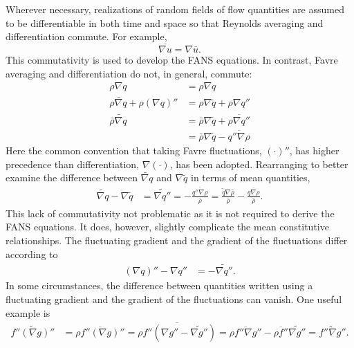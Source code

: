 Wherever necessary, realizations of random fields of flow quantities
are assumed to be differentiable in both time and space so that Reynolds
averaging and differentiation commute.  For example,
%
\begin{equation*}
\overline{ \nabla{}u } = \nabla\bar{u}.
\end{equation*}
%
This commutativity is used to develop the FANS equations.  In contrast, Favre
averaging and differentiation do not, in general, commute:
\begin{align}
  \rho \nabla q &= \rho \nabla q
\\
   \rho \widetilde{\nabla{}q} + \rho \left(\nabla{}q\right)''
&=
   \rho \nabla \tilde{q} + \rho \nabla{}q''
\\
     \bar{\rho} \widetilde{\nabla{}q}
&=
     \bar{\rho} \nabla{\tilde{q}}
   + \overline{\rho \nabla{}q''}
\\
&=
     \bar{\rho} \nabla{\tilde{q}}
   - \overline{q''\nabla\rho}
\end{align}
Here the common convention that taking Favre fluctuations,
$\left(\cdot\right)''$, has higher precedence than differentiation,
$\nabla\left(\cdot\right)$, has been adopted.  Rearranging to better examine
the difference between $\widetilde{\nabla{}q}$ and $\nabla\tilde{q}$ in terms
of mean quantities,
\begin{align}
  \label{eq:favremeancommute}
  \widetilde{\nabla{}q}
  -
  \nabla{\tilde{q}}
&=
  \widetilde{\nabla{}q''}
= - \frac{{\overline{q''\nabla\rho}}}{\bar{\rho}}
= \frac{\tilde{q}\nabla\bar{\rho}}{\bar{\rho}}
  - \frac{\overline{q\nabla\rho}}{\bar{\rho}}
.
\end{align}
This lack of commutativity not problematic as it is not required to derive the
FANS equations.  It does, however, slightly complicate the mean constitutive
relationships.  The fluctuating gradient and the gradient of the fluctuations
differ according to
\begin{align}
  \label{eq:favrefluctcommute}
  \left(\nabla{}q\right)'' - \nabla{}q'' &= - \widetilde{\nabla{}q''}
.
\end{align}
In some circumstances, the difference between quantities written using a
fluctuating gradient and the gradient of the fluctuations can vanish.
One useful example is
\begin{align}
  \label{eq:favrefluctexample}
\widetilde{f''\left(\nabla{}g\right)''}
&=
\overline{\rho{}f''\left(\nabla{}g\right)''}
=
\overline{\rho{}f''\left(\nabla{}g'' - \widetilde{\nabla{}g''}\right)}
=
\overline{\rho{}f''\nabla{}g''}
- \overline{\rho{}f''}\widetilde{\nabla{}g''}
=
\widetilde{f''\nabla{}g''}
.
\end{align}

